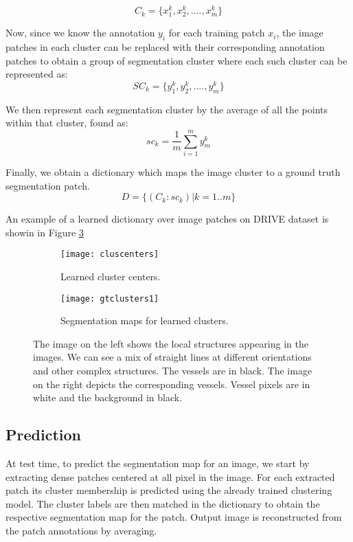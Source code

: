 $$
C_k = \{x^k_1,x^k_2,....,x^k_m\}
$$

Now, since we know the annotation $y_i$ for each training patch $x_i$, the image patches in each cluster can be replaced with their corresponding annotation patches to obtain a group of segmentation cluster where each such cluster can be represented as:
$$
SC_k = \{y^k_1,y^k_2,....,y^k_m\}
$$

We then represent each segmentation cluster by the average of all the points within that cluster, found as:
$$	
sc_k = \frac{1}{m}\sum\limits_{i=1}^{m} y^k_m
$$

Finally, we obtain a dictionary which maps the image cluster to a ground truth segmentation patch.
$$
D = \{ (C_k : sc_k) | k =1..m\}
$$

An example of a learned dictionary over image patches on DRIVE dataset is showin in Figure \ref{fig:cb-cls}
\begin{figure}
	\begin{subfigure}[b]{0.45\textwidth}
		\texttt{[image: cluscenters]}
		\caption{Learned cluster centers.}
		\label{fig:cluscenters}
	\end{subfigure}
	\begin{subfigure}[b]{0.45\textwidth}
		\texttt{[image: gtclusters1]}
		\caption{Segmentation maps for learned clusters.}
		\label{fig:gtclusters}
	\end{subfigure}
	\caption[Local structures learned using clustering and their segmentation maps]{The image on the left shows the local structures appearing in the images. We can see a mix of straight lines at different orientations and other complex structures. The vessels are in black. The image on the right depicts the corresponding vessels. Vessel pixels are in white and the background in black.}
	\label{fig:cb-cls}
\end{figure}

\subsection{Prediction}
At test time, to predict the segmentation map for an image, we start by extracting dense patches centered at all pixel in the image. For each extracted patch its cluster membership is predicted using the already trained clustering model. The cluster labels are then matched in the dictionary to obtain the respective segmentation map for the patch. Output image is reconstructed from the patch annotations by averaging. 

